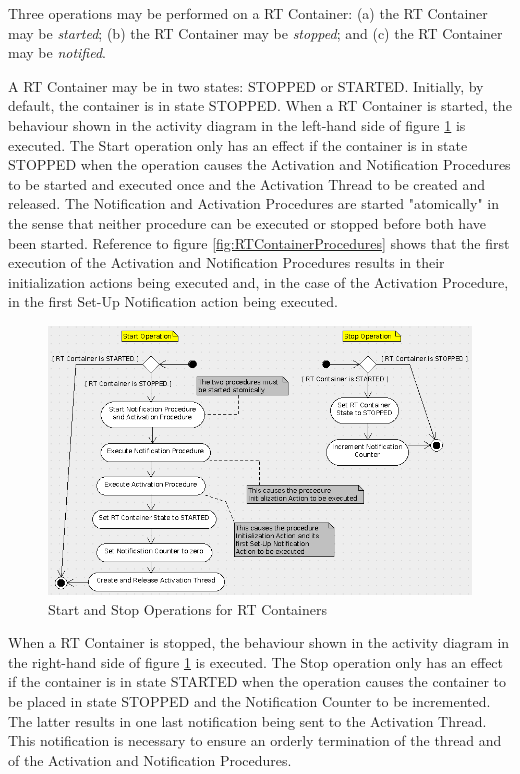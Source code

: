 Three operations may be performed on a RT Container: (a) the RT Container may be \emph{started}; (b) the RT Container may be \emph{stopped}; and (c) the RT Container may be \emph{notified}.

A RT Container may be in two states: STOPPED or STARTED. Initially, by default, the container is in state STOPPED. When a RT Container is started, the behaviour shown in the activity diagram in the left-hand side of figure \ref{fig:RTStartStop} is executed. The Start operation only has an effect if the container is in state STOPPED when the operation causes the Activation and Notification Procedures to be started and executed once and the Activation Thread to be created and released. The Notification and Activation Procedures are started "atomically" in the sense that neither procedure can be executed or stopped before both have been started. Reference to figure \ref{fig:RTContainerProcedures} shows that the first execution of the Activation and Notification Procedures results in their initialization actions being executed and, in the case of the Activation Procedure, in the first Set-Up Notification action being executed. 

\begin{figure}[ht]
 \centering
 \includegraphics[scale=0.39,keepaspectratio=true]{RTStartStop.png}
 \caption{Start and Stop Operations for RT Containers}
 \label{fig:RTStartStop}
\end{figure}

When a RT Container is stopped, the behaviour shown in the activity diagram in the right-hand side of figure \ref{fig:RTStartStop} is executed. The Stop operation only has an effect if the container is in state STARTED when the operation causes the container to be placed in state STOPPED and the Notification Counter to be incremented. The latter results in one last notification being sent to the Activation Thread. This notification is necessary to ensure an orderly termination of the thread and of the Activation and Notification Procedures. 

